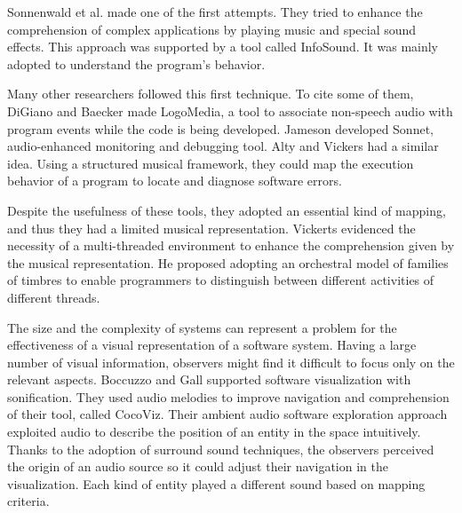 \bigbreak
Sonnenwald et al. made one of the first attempts. \cite{Sonnenwald1990}
They tried to enhance the comprehension of complex applications by playing music and special sound effects. 
This approach was supported by a tool called InfoSound.
It was mainly adopted to understand the program's behavior. 

\bigbreak
Many other researchers followed this first technique. To cite some of them, DiGiano and Baecker \cite{DiGiano1993} made LogoMedia, a tool to associate non-speech
 audio with program events while the code is being developed. 
Jameson \cite{Jameson1994} developed Sonnet, audio-enhanced monitoring and debugging tool.  
Alty and Vickers \cite{Vickers2003} had a similar idea. Using a structured musical framework, they could map the execution behavior of a program to locate and diagnose software errors. 
 
\bigbreak
Despite the usefulness of these tools, they adopted an essential kind of mapping, and thus they had a limited musical representation. 
Vickerts \cite{Vickers2004} evidenced the necessity of a multi-threaded environment to enhance the comprehension given by the musical representation. 
He proposed adopting an orchestral model of families of timbres to enable programmers to distinguish between different activities of different threads.

\bigbreak
The size and the complexity of systems can represent a problem for the effectiveness of a visual representation of a software system.
Having a large number of visual information, observers might find it difficult to focus only on the relevant aspects. 
Boccuzzo and Gall \cite{Boccuzzo2009} supported software visualization with sonification. 
They used audio melodies to improve navigation and comprehension of their tool, called CocoViz.
Their ambient audio software exploration approach exploited audio to describe the position of an entity in the space intuitively. 
Thanks to the adoption of surround sound techniques, the observers perceived the origin of an audio source so it could adjust their navigation in the visualization.
Each kind of entity played a different sound based on mapping criteria.

